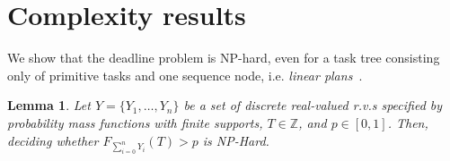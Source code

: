 \documentclass{article}
\newtheorem{lemma}{Lemma}
\begin{document}
%
%
%
%



\section{Complexity results}\label{sec:complexity}

We show that the deadline problem is NP-hard, 
even for a task tree consisting only of primitive tasks and one sequence node, i.e.
{\em linear plans}~\cite{Russell:2003:AIM:773294,simmons2001planning,aktolga2004java}. 

\begin{lemma} \label{SumDiscreteRV}
Let $Y=\{Y_1,\dots,Y_n\}$ be a set of discrete real-valued r.v.s specified by probability mass functions 
with finite supports, $T \in \mathbb{Z}$, and $p\in[0,1]$. Then, deciding  whether $F_{\sum_{i=0}^{n} Y_{i}}(T)>p $ is NP-Hard.
\end{lemma}
\end{document}
